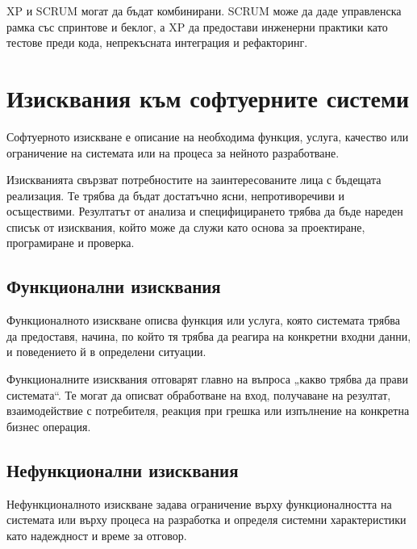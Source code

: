 XP и SCRUM могат да бъдат комбинирани. SCRUM може да даде управленска рамка със спринтове и беклог, а XP да предостави инженерни практики като тестове преди кода, непрекъсната интеграция и рефакторинг.

\section{Изисквания към софтуерните системи}\label{s:26.5}

\begin{defn}
Софтуерното изискване е описание на необходима функция, услуга, качество или ограничение на системата или на процеса за нейното разработване.
\end{defn}

Изискванията свързват потребностите на заинтересованите лица с бъдещата реализация. Те трябва да бъдат достатъчно ясни, непротиворечиви и осъществими. Резултатът от анализа и специфицирането трябва да бъде нареден списък от изисквания, който може да служи като основа за проектиране, програмиране и проверка.

\subsection{Функционални изисквания}\label{s:26.5.1}

\begin{defn}
Функционалното изискване описва функция или услуга, която системата трябва да предоставя, начина, по който тя трябва да реагира на конкретни входни данни, и поведението й в определени ситуации.
\end{defn}

Функционалните изисквания отговарят главно на въпроса „какво трябва да прави системата“. Те могат да описват обработване на вход, получаване на резултат, взаимодействие с потребителя, реакция при грешка или изпълнение на конкретна бизнес операция.

\subsection{Нефункционални изисквания}\label{s:26.5.2}

\begin{defn}
Нефункционалното изискване задава ограничение върху функционалността на системата или върху процеса на разработка и определя системни характеристики като надеждност и време за отговор.
\end{defn}

